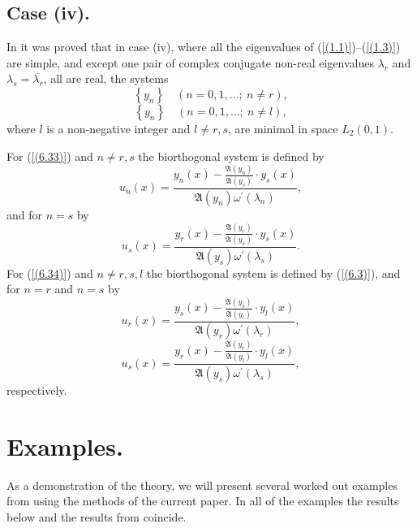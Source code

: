 \documentclass[10pt,a4paper]{amsart}
\numberwithin{equation}{section}
\begin{document}
\subsection{Case (iv).}

In \cite{aliyev5} it was proved that in case (iv), where  all the eigenvalues of (\ref{(1.1)})--(\ref{(1.3)}) are simple, and except one pair of
complex conjugate non-real eigenvalues $\lambda_r$ and $\lambda_s=\overline{\lambda_r}$, all are real, the systems
\begin{equation}
 \left\{ y_n \right\} \quad (n=0,1,\ldots;\ n\neq r),\label{(6.33)}
\end{equation}
\begin{equation}
\left\{ y_n \right\} \quad (n=0,1,\ldots;\ n\neq l), \label{(6.34)}
\end{equation}
where $l$ is a non-negative integer and $l\neq r,s$, are minimal in space $L_2(0,1)$.



 For (\ref{(6.33)}) and $n \ne r,s$ the biorthogonal system is defined by
\begin{equation}
u_n(x)=\frac{y_n(x)-\frac{\mathfrak{A}(y_{n})}{\mathfrak{A}(y_s)}\cdot y_s(x)}{ \mathfrak{A}(y_{n})\omega^\prime(\lambda_n)}
,\label{(6.35)}
\end{equation}
and for $n =s$ by
\begin{equation}
u_s(x)=\frac{y_r(x)-\frac{\mathfrak{A}(y_{r})}{\mathfrak{A}(y_s)}\cdot y_s(x)}{ \mathfrak{A}(y_{s})\omega^\prime(\lambda_s)}
. \label{(6.36)}
\end{equation}
For (\ref{(6.34)}) and $n \ne r,s,l$ the biorthogonal system is defined by (\ref{(6.3)}),
and for $n =r$ and $n =s$ by
\begin{equation}
u_r(x)=\frac{y_s(x)-\frac{\mathfrak{A}(y_{s})}{\mathfrak{A}(y_l)}\cdot y_l(x)}{ \mathfrak{A}(y_{r})\omega^\prime(\lambda_r)}
, \label{(6.37)}
\end{equation}
\begin{equation}
u_s(x)=\frac{y_r(x)-\frac{\mathfrak{A}(y_{r})}{\mathfrak{A}(y_l)}\cdot y_l(x)}{ \mathfrak{A}(y_{s})\omega^\prime(\lambda_s)}
, \label{(6.38)}
\end{equation}
respectively.


\section{Examples.} As a demonstration of the theory, we will present several worked out examples from \cite{aliyev5} using the methods of the current paper. In all of the examples the results below and the results from \cite{aliyev5} coincide.
\end{document}
